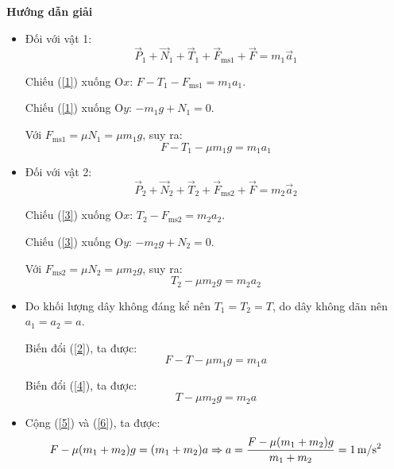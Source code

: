{	\begin{center}
		\textbf{Hướng dẫn giải}
	\end{center}
	
	\begin{center}
	\end{center}

	\begin{itemize}
		\item Đối với vật 1:
		\begin{equation}\label{1}
			\vec P_1 + \vec N_1 + \vec T_1 + \vec F_\text{ms1} + \vec F = m_1 \vec a_1
		\end{equation}
	
		Chiếu (\ref{1}) xuống O$x$: $F - T_1 - F_\text{ms1} = m_1 a_1$.
		
		Chiếu (\ref{1}) xuống O$y$: $-m_1 g + N_1 = 0$.
		
		Với $F_\text{ms1} = \mu N_1 = \mu m_1 g$, suy ra:
		\begin{equation}\label{2}
			F-T_1 - \mu m_1 g = m_1 a_1
		\end{equation}
		\item Đối với vật 2:
				\begin{equation}\label{3}
			\vec P_2 + \vec N_2 + \vec T_2 + \vec F_\text{ms2} + \vec F = m_2 \vec a_2
		\end{equation}
		
		Chiếu (\ref{3}) xuống O$x$: $T_2 - F_\text{ms2} = m_2 a_2$.
		
		Chiếu (\ref{3}) xuống O$y$: $-m_2 g + N_2 = 0$.
		
		Với $F_\text{ms2} = \mu N_2 = \mu m_2 g$, suy ra:
		\begin{equation}\label{4}
			T_2 - \mu m_2 g = m_2 a_2
		\end{equation}
	
		\item Do khối lượng dây không đáng kể nên $T_1 = T_2 = T$, do dây không dãn nên $a_1 = a_2 = a$.
		
		Biến đổi (\ref{2}), ta được:
		\begin{equation}\label{5}
			F - T - \mu m_1 g = m_1 a
		\end{equation}
	
		Biến đổi (\ref{4}), ta được:
		\begin{equation}\label{6}
			T - \mu m_2 g= m_2 a
		\end{equation}
	
		\item Cộng (\ref{5}) và (\ref{6}), ta được:
		\begin{equation*}
			F - \mu (m_1 + m_2) g = (m_1 + m_2) a \\
			\Rightarrow a = \dfrac{F - \mu (m_1 + m_2)g}{m_1 + m_2} = \SI{1}{m/s^2}
		\end{equation*}
	\end{itemize}
}
